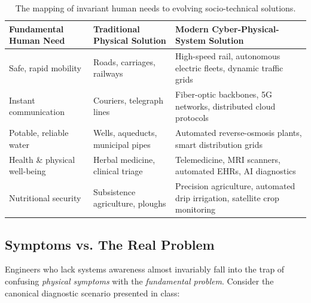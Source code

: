 \begin{table}[htbp]
\centering
\small
\renewcommand{\arraystretch}{1.2}
\begin{tabularx}{\textwidth}{p{3.2cm} p{4.2cm} X}
\toprule
\textbf{Fundamental Human Need} & \textbf{Traditional Physical Solution} & \textbf{Modern Cyber-Physical-System Solution} \\
\midrule
Safe, rapid mobility & Roads, carriages, railways & High-speed rail, autonomous electric fleets, dynamic traffic grids \\
Instant communication & Couriers, telegraph lines & Fiber-optic backbones, 5G networks, distributed cloud protocols \\
Potable, reliable water & Wells, aqueducts, municipal pipes & Automated reverse-osmosis plants, smart distribution grids \\
Health \& physical well-being & Herbal medicine, clinical triage & Telemedicine, MRI scanners, automated EHRs, AI diagnostics \\
Nutritional security & Subsistence agriculture, ploughs & Precision agriculture, automated drip irrigation, satellite crop monitoring \\
\bottomrule
\end{tabularx}
\caption{The mapping of invariant human needs to evolving socio-technical solutions.}
\end{table}

\subsection{Symptoms vs. The Real Problem}
Engineers who lack systems awareness almost invariably fall into the trap of confusing \textit{physical symptoms} with the \textit{fundamental problem}. Consider the canonical diagnostic scenario presented in class:


